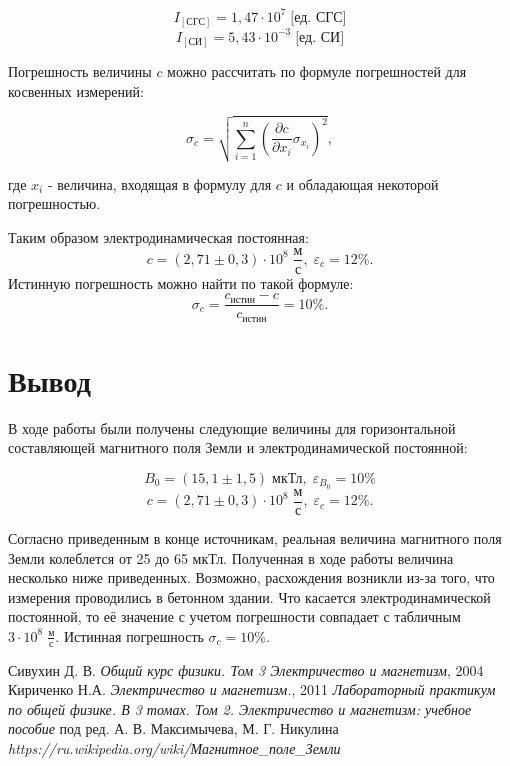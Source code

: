 \documentclass[12pt,a4paper]{article}
\begin{document}
$$I_{\left[\text{СГС}\right]}=1,47\cdot10^7\;\text{[ед. СГС]}$$
$$I_{\left[\text{СИ}\right]}=5,43\cdot10^{-3}\;\text{[ед. СИ]}$$

Погрешность величины $c$ можно рассчитать по формуле погрешностей для косвенных измерений:

$$\sigma_c=\sqrt{ \sum\limits_{i=1}^n \left(\frac{\partial c}{\partial x_i}\sigma_{x_i} \right)^2},$$

где $x_i$ - величина, входящая в формулу для $c$ и обладающая некоторой погрешностью.

Таким образом электродинамическая постоянная:
$$c=(2,71\pm0,3)\cdot 10^8 \; \frac{\text{м}}{\text{с}}, \; \varepsilon_c=12\%.$$
Истинную погрешность можно найти по такой формуле:
$$\sigma_c=\frac{c_\text{истин}-c}{c_\text{истин}}=10\%.$$

\newpage

\section*{Вывод}

В ходе работы были получены следующие величины для горизонтальной составляющей магнитного поля Земли и электродинамической постоянной:

$$B_0=\left(15,1\pm1,5\right) \; \text{мкТл}, \; \varepsilon_{B_0}=10\%$$
$$c=(2,71\pm0,3)\cdot 10^8 \; \frac{\text{м}}{\text{с}}, \; \varepsilon_c=12\%.$$

Согласно приведенным в конце источникам, реальная величина магнитного поля Земли колеблется от 25 до 65 мкТл.
Полученная в ходе работы величина несколько ниже приведенных. Возможно, расхождения возникли из-за того, что измерения проводились в бетонном здании. Что касается электродинамической постоянной, то её значение с учетом погрешности совпадает с табличным $3\cdot10^8\;\frac{\text{м}}{\text{с}}$. Истинная погрешность $\sigma_c=10\%$.


\begin{thebibliography}{4}
	 Сивухин Д. В. \emph{Общий курс физики. Том 3 Электричество и магнетизм}, 2004
	 Кириченко Н.А. \emph{Электричество и магнетизм.}, 2011
	 \emph{Лабораторный практикум по общей физике. В 3 томах. Том 2. Электричество и магнетизм: учебное пособие} под ред. А. В. Максимычева, М. Г. Никулина
	 \emph{https://ru.wikipedia.org/wiki/Магнитное\_поле\_Земли}
\end{thebibliography}
\end{document}
